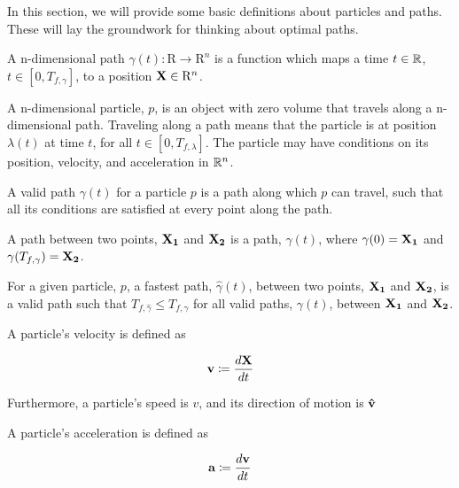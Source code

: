 In this section, we will provide some basic definitions about particles and paths. These will lay the groundwork for thinking about optimal paths.

\begin{definition}
A n-dimensional path $\gamma(t): \mathrm{R} \to \mathrm{R}^n$ is a function which maps a time $t \in \mathbb R$, $t \in [0, T_{f, \gamma}]$, to a position $\mathbf{X} \in \mathrm{R}^n$. 
\end{definition}

\begin{definition}
  A n-dimensional particle, $p$, is an object with zero volume that travels along a n-dimensional path. Traveling along a path means that the particle is at position $\lambda(t)$ at time $t$, for all $t \in [0, T_{f,\lambda}]$. The particle may have conditions on its position, velocity, and acceleration in $\mathbb R^n$.
\end{definition}

\begin{definition}
  A valid path $\gamma(t)$ for a particle $p$ is a path along which $p$ can travel, such that all its conditions are satisfied at every point along the path.
\end{definition}

\begin{definition}
  A path between two points, $\mathbf{X_1}$ and $\mathbf{X_2}$ is a path, $\gamma(t)$, where $\gamma(0) = \mathbf{X_1}$ and $\gamma(T_{f, \gamma}) = \mathbf{X_2}$.
\end{definition}

\begin{definition}
  For a given particle, $p$, a fastest path, $\hat{\gamma}(t)$, between two points, $\mathbf{X_1}$ and $\mathbf{X_2}$, is a valid path such that $T_{f,\hat{\gamma}} \leq T_{f,\gamma}$ for all valid paths, $\gamma(t)$, between $\mathbf{X_1}$ and $\mathbf{X_2}$.
\end{definition}

\begin{definition}
  A particle's velocity is defined as 

  \[\mathbf{v} \coloneqq \frac{d\mathbf{X}}{dt}\]

  Furthermore, a particle's speed is $v$, and its direction of motion is $\mathbf{\hat{v}}$

\end{definition}

\begin{definition}
  A particle's acceleration is defined as 
  
  \[\mathbf{a} \coloneqq \frac{d\mathbf{v}}{dt}\]
\end{definition}

